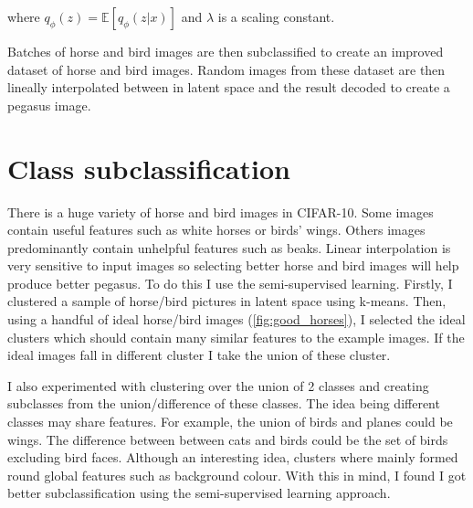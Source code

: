 \documentclass{article}
\begin{document}
where $q_\phi(z) =  \mathbb{E}[q_\phi(z|x)]$ and $\lambda$ is a scaling constant.

Batches of horse and bird images are then subclassified to create an improved dataset of horse and bird images. Random images from these dataset are then lineally interpolated between in latent space and the result decoded to create a pegasus image. 

\section{Class subclassification}
There is a huge variety of horse and bird images in CIFAR-10. Some images contain useful features such as white horses or birds' wings. Others images predominantly contain unhelpful features such as beaks. Linear interpolation is very sensitive to input images so selecting better horse and bird images will help produce better pegasus. To do this I use the semi-supervised learning. Firstly, I clustered a sample of horse/bird pictures in latent space using k-means. Then, using a handful of ideal horse/bird images (\ref{fig:good_horses}), I selected the ideal clusters which should contain many similar features to the example images. If the ideal images fall in different cluster I take the union of these cluster.

I also experimented with clustering over the union of 2 classes and creating subclasses from the union/difference of these classes. The idea being different classes may share features. For example, the union of birds and planes could be wings. The difference between between cats and birds could be the set of birds excluding bird faces. Although an interesting idea, clusters where mainly formed round global features such as background colour. With this in mind, I found I got better subclassification using the semi-supervised learning approach.
\end{document}
